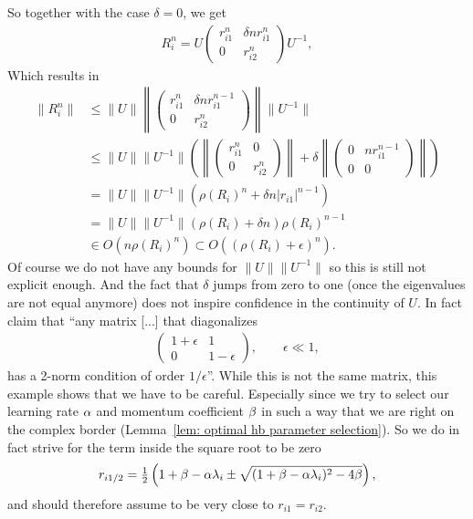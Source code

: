 So together with the case \(\delta=0\), we get
\begin{align*}
	R_i^n = U\begin{pmatrix}
		r_{i1}^n & \delta n r_{i1}^n\\
		0 & r_{i2}^n
	\end{pmatrix}U^{-1},
\end{align*}
Which results in
\begin{align*}
	\|R_i^n\|
	&\le \|U\|
	\left\| \begin{pmatrix}
		r_{i1}^n & \delta n r_{i1}^{n-1}\\
		0 & r_{i2}^n
	\end{pmatrix} \right\|
	\|U^{-1}\|\\
	&\le \|U\|\|U^{-1}\|
	\left(
	\left\| \begin{pmatrix}
		r_{i1}^n & 0\\
		0 & r_{i2}^n
	\end{pmatrix} \right\|
	+ \delta
	\left\| \begin{pmatrix}
		0 &  n r_{i1}^{n-1}\\
		0 & 0
	\end{pmatrix} \right\|
	\right)\\
	&= \|U\|\|U^{-1}\| (\rho(R_i)^n+ \delta n |r_{i1}|^{n-1})\\
	&= \|U\|\|U^{-1}\| (\rho(R_i)+ \delta n)\rho(R_i)^{n-1}\\
	&\in O(n\rho(R_i)^{n}) \subset O((\rho(R_i)+\epsilon)^n).
\end{align*}
%
Of course we do not have any bounds for \(\|U\|\|U^{-1}\|\) so this is still
not explicit enough. And the fact that \(\delta\) jumps from zero to one (once the
eigenvalues are not equal anymore) does not inspire confidence in the continuity
of \(U\). In fact \textcite[Section 7.1.5]{golubMatrixComputations2013} claim
that ``any matrix [...] that diagonalizes
\begin{align*}
	\begin{pmatrix}
		1+\epsilon & 1 \\
		0 & 1-\epsilon
	\end{pmatrix},
	\qquad \epsilon \ll 1,
\end{align*}
has a 2-norm condition of order \(1/\epsilon\)''. While this is not the same matrix,
this example shows that we have to be careful. Especially since we try to select
our learning rate \(\alpha\) and momentum coefficient \(\beta\) in such a way
that we are right on the complex border (Lemma~\ref{lem: optimal hb parameter
selection}). So we do in fact strive for the term inside the square root to be zero
\begin{align*}
	r_{i1/2}
	= \tfrac12 \left(
		1+\beta-\alpha\lambda_i
		\pm \sqrt{(1+\beta-\alpha\lambda_i)^2 - 4\beta}
	\right),
\end{align*}
and should therefore assume to be very close to \(r_{i1}=r_{i2}\).


